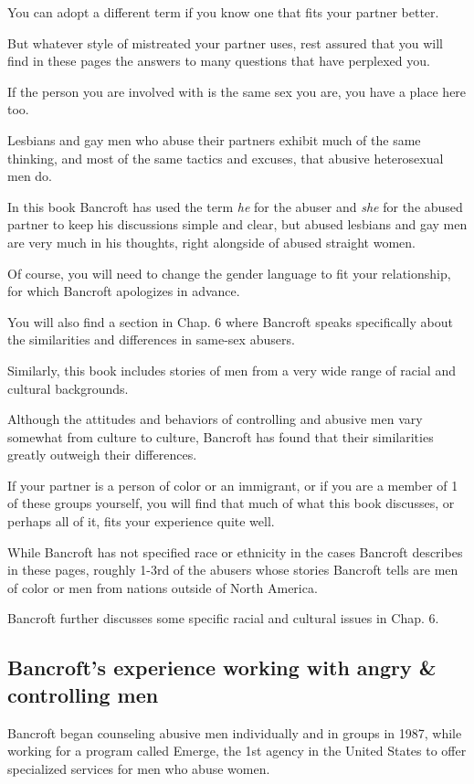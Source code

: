\documentclass[oneside]{article}
\numberwithin{equation}{section}
\begin{document}
You can adopt a different term if you know one that fits your partner better.

But whatever style of mistreated your partner uses, rest assured that you will find in these pages the answers to many questions that have perplexed you.

%
If the person you are involved with is the same sex you are, you have a place here too.

Lesbians and gay men who abuse their partners exhibit much of the same thinking, and most of the same tactics and excuses, that abusive heterosexual men do.

In this book Bancroft has used the term \textit{he} for the abuser and \textit{she} for the abused partner to keep his discussions simple and clear, but abused lesbians and gay men are very much in his thoughts, right alongside of abused straight women.

Of course, you will need to change the gender language to fit your relationship, for which Bancroft apologizes in advance.

You will also find a section in Chap. 6 where Bancroft speaks specifically about the similarities and differences in same-sex abusers.

%
Similarly, this book includes stories of men from a very wide range of racial and cultural backgrounds.

Although the attitudes and behaviors of controlling and abusive men vary somewhat from culture to culture, Bancroft has found that their similarities greatly outweigh their differences.

If your partner is a person of color or an immigrant, or if you are a member of 1 of these groups yourself, you will find that much of what this book discusses, or perhaps all of it, fits your experience quite well.

While Bancroft has not specified race or ethnicity in the cases Bancroft describes in these pages, roughly 1-3rd of the abusers whose stories Bancroft tells are men of color or men from nations outside of North America.

Bancroft further discusses some specific racial and cultural issues in Chap. 6.

\subsection{Bancroft's experience working with angry \& controlling men}
Bancroft began counseling abusive men individually and in groups in 1987, while working for a program called Emerge, the 1st agency in the United States to offer specialized services for men who abuse women.
\end{document}
